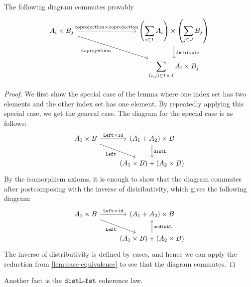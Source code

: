 \begin{lemma}
    \label{lem:distributivity}
    The following diagram commutes provably
    \[
\begin{tikzcd}
    [column sep=3cm]
A_i \times B_j
\ar[r,"{\text{coprojection} \times \text{coprojection}}"]
\ar[dr,"\text{coprojection}"']
&
\displaystyle{\left(\sum_{i \in I} A_i \right) \times \left(\sum_{j \in J} B_j \right) }
\ar[d,"\text{distribute}"]
\\
&
\displaystyle{\sum_{(i,j) \in I \times J} A_i \times B_j}
\end{tikzcd}
\]
\end{lemma}
\begin{proof}
    We first show the special case of the lemma where one index set has two elements and the other index set has one element. By repeatedly applying this special case, we get the general case. The diagram for the special case is as follows:
 \[
\begin{tikzcd}
A_1 \times B
\ar[r,"\leftterm \times \idterm"]
\ar[dr,"\leftterm"']
 & (A_1 + A_2) \times B 
\ar[d,"\distlterm"]
 \\
& (A_1 \times B) + (A_2 \times B)
\end{tikzcd}
\]
By the isomorphism axioms, it is enough to show that the diagram commutes after postcomposing with the inverse of distributivity, which gives the following diagram:
 \[
\begin{tikzcd}
A_1 \times B
\ar[r,"\leftterm \times \idterm"]
\ar[dr,"\leftterm"']
 & (A_1 + A_2) \times B 
 \\
& (A_1 \times B) + (A_2 \times B)
\ar[u,"\undistlterm"']
\end{tikzcd}
\]
The inverse of distributivity is defined by cases, and hence we can apply the reduction from \cref{lem:case-equivalence} to see that the diagram commutes.
\end{proof}

Another fact is the $\mathtt{distL}\text{-}\mathtt{fst}$ coherence law.

